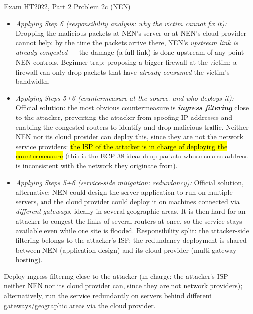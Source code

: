 \documentclass[12pt, a4paper]{article}
\newcommand{\term}[1]{\textbf{\textit{#1}}}        %
\newcommand{\imp}[1]{\hl{#1}}                       %
\begin{document}
\begin{practicebox}{Exam HT2022, Part 2 Problem 2c (NEN)}
\begin{itemize}
    Note what is \emph{not} the issue here: there is no protocol-level flaw in the NEN application to patch --- the resource being exhausted is the network link itself.
    \item \textit{Applying Step 6 (responsibility analysis: why the victim cannot fix it):} Dropping the malicious packets at NEN's server or at NEN's cloud provider cannot help: by the time the packets arrive there, NEN's \emph{upstream link is already congested} --- the damage (a full link) is done upstream of any point NEN controls.
    Beginner trap: proposing a bigger firewall at the victim; a firewall can only drop packets that have \emph{already consumed} the victim's bandwidth.
    \item \textit{Applying Steps 5+6 (countermeasure at the source, and who deploys it):} Official solution: the most obvious countermeasure is \term{ingress filtering} close to the attacker, preventing the attacker from spoofing IP addresses and enabling the congested routers to identify and drop malicious traffic.
    Neither NEN nor its cloud provider can deploy this, since they are not the network service providers: \imp{the ISP of the attacker is in charge of deploying the countermeasure} (this is the BCP 38 idea: drop packets whose source address is inconsistent with the network they originate from).
    \item \textit{Applying Steps 5+6 (service-side mitigation: redundancy):} Official solution, alternative: NEN could design the server application to run on multiple servers, and the cloud provider could deploy it on machines connected via \emph{different gateways}, ideally in several geographic areas.
    It is then hard for an attacker to congest the links of several routers at once, so the service stays available even while one site is flooded.
    Responsibility split: the attacker-side filtering belongs to the attacker's ISP; the redundancy deployment is shared between NEN (application design) and its cloud provider (multi-gateway hosting).
\end{itemize}

\begin{answerbox}
Deploy ingress filtering close to the attacker (in charge: the attacker's ISP --- neither NEN nor its cloud provider can, since they are not network providers); alternatively, run the service redundantly on servers behind different gateways/geographic areas via the cloud provider.
\end{answerbox}
\end{practicebox}
\end{document}
